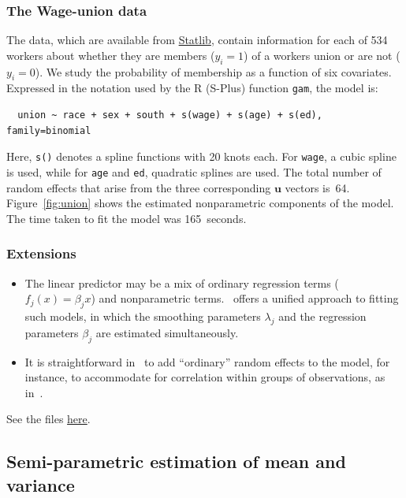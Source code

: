 \documentclass{admbmanual}
\newcommand{\citeasnoun}{\cite}
\begin{document}
\subsubsection{The Wage-union data}

The data, which are available from \href{lib.stat.cmu.edu/}{Statlib}, contain
information for each of 534 workers about whether they are members ($y_i=1$)
of a workers union or are not ($y_i=0$). We study the probability of
membership as a function of six covariates. Expressed in the notation used by
the R (S-Plus) function \texttt{gam}, the model is:
\begin{verbatim}
  union ~ race + sex + south + s(wage) + s(age) + s(ed), family=binomial
\end{verbatim}

Here, \texttt{s()} denotes a spline functions with 20 knots each. For
\texttt{wage}, a cubic spline is used, while for \texttt{age} and \texttt{ed},
quadratic splines are used. The total number of random effects that arise from
the three corresponding $\mathbf{u}$ vectors is~64. Figure~\ref{fig:union} shows
the estimated nonparametric components of the model. The time taken to fit the
model was 165~seconds.

\subsubsection{Extensions}

\begin{itemize}
  \item The linear predictor may be a mix of ordinary regression terms
  ($f_j(x)=\beta_jx$) and nonparametric terms. \scAR\ offers a unified
  approach to fitting such models, in which the smoothing parameters
  $\lambda_j$ and the regression parameters $\beta_j$ are estimated
  simultaneously.

  \item It is straightforward in \scAR\ to add ``ordinary'' random effects to
  the model, for instance, to accommodate for correlation within groups of
  observations, as in~\citeasnoun{lin:zhan:1999}.
\end{itemize}

See the files
\href{http://otter-rsch.com/admbre/examples/union/union.html}{here}.

\subsection{Semi-parametric estimation of mean and variance}
\label{sec:lidar}
\end{document}
